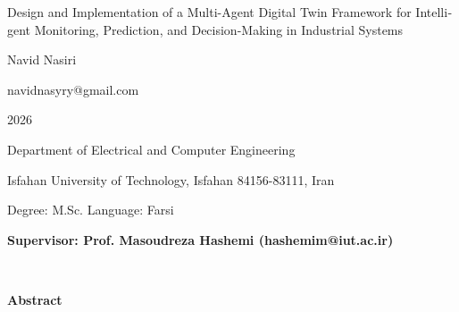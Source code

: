 \thispagestyle{empty}

\begin{latin}
\begin{center}

{\huge Design and Implementation of a Multi-Agent Digital Twin Framework for Intelligent Monitoring, Prediction, and Decision-Making in Industrial Systems}

\vspace{1cm}

{\LARGE{Navid Nasiri}}

\vspace{0.2cm}

{\small navidnasyry@gmail.com}

\vspace{0.5cm}

2026

\vspace{0.5cm}

Department of Electrical and Computer Engineering

\vspace{0.2cm}

Isfahan University of Technology, Isfahan 84156-83111, Iran

\vspace{0.2cm}

Degree: M.Sc. \hspace*{3cm} Language: Farsi

\vspace{1cm}

{\small\textbf{Supervisor: Prof. Masoudreza Hashemi (hashemim@iut.ac.ir)}}
\end{center}
~\vfill


\noindent\textbf{Abstract}

\begin{small}
\baselineskip=0.6cm


\end{small}
\end{latin}
